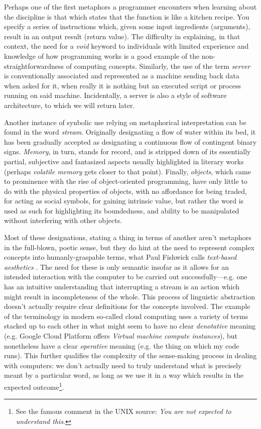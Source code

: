 Perhaps one of the first metaphors a programmer encounters when learning about the discipline is that which states that the function is like a kitchen recipe. You specify a series of instructions which, given some input ingredients (arguments), result in an output result (return value). The difficulty in explaining, in that context, the need for a \emph{void} keyword to individuals with limited experience and knowledge of how programming works is a good example of the non-straightforwardness of computing concepts. Similarly, the use of the term \emph{server} is conventionally associated and represented as a machine sending back data when asked for it, when really it is nothing but an executed script or process running on said machine. Incidentally, a server is also a style of software architecture, to which we will return later.

Another instance of synbolic use relying on metaphorical interpretation can be found in the word \emph{stream}. Originally designating a flow of water within its bed, it has been gradually accepted as designating a continuous flow of contingent binary signs. \emph{Memory}, in turn, stands for record, and is stripped down of its essentially partial, subjective and fantasized aspects usually highlighted in literary works (perhaps \emph{volatile memory} gets closer to that point). Finally, \emph{objects}, which came to prominence with the rise of object-oriented programming, have only little to do with the physical properties of objects, with no affordance for being traded, for acting as social symbols, for gaining intrinsic value, but rather the word is used as such for highlighting its boundedness, and ability to be manipulated without interfering with other objects.

Most of these designations, stating a thing in terms of another aren't metaphors in the full-blown, poetic sense, but they do hint at the need to represent complex concepts into humanly-graspable terms, what Paul Fishwick calls \emph{text-based aesthetics} \citep{fishwick_aesthetic_2001}. The need for these is only semantic insofar as it allows for an intended interaction with the computer to be carried out successfully—e.g. one has an intuitive understanding that interrupting a stream is an action which might result in incompleteness of the whole. This process of linguistic abstraction doesn't actually require clear definitions for the concepts involved. The example of the terminology in modern so-called cloud computing uses a variety of terms stacked up to each other in what might seem to have no clear \emph{denotative} meaning (e.g. Google Cloud Platform offers \emph{Virtual machine compute instances}), but nonetheless have a clear \emph{operative} meaning (e.g. the thing on which my code runs). This further qualifies the complexity of the sense-making process in dealing with computers: we don't actually need to truly understand what is precisely meant by a particular word, as long as we use it in a way which results in the expected outcome\footnote{See the famous comment in the UNIX source: \emph{You are not expected to understand this}.}.


